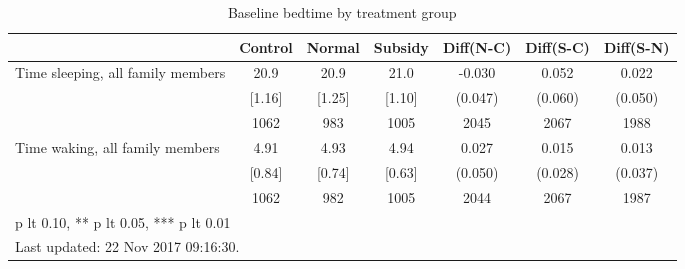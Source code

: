 \begin{table}[htbp]\centering
\def\sym#1{\ifmmode^{#1}\else\(^{#1}\)\fi}
\caption{Baseline bedtime by treatment group \label{tab:"balance"}}
\begin{tabular*}{1\hsize}{@{\hskip\tabcolsep\extracolsep\fill}l*{1}{cccccc}}
\toprule
                                &  Control&   Normal&  Subsidy&Diff(N-C)         &Diff(S-C)         &Diff(S-N)         \\
\midrule
Time sleeping, all family members&     20.9&     20.9&     21.0&   -0.030         &    0.052         &    0.022         \\
                                &   [1.16]&   [1.25]&   [1.10]&  (0.047)         &  (0.060)         &  (0.050)         \\
                                &     1062&      983&     1005&     2045         &     2067         &     1988         \\
Time waking, all family members &     4.91&     4.93&     4.94&    0.027         &    0.015         &    0.013         \\
                                &   [0.84]&   [0.74]&   [0.63]&  (0.050)         &  (0.028)         &  (0.037)         \\
                                &     1062&      982&     1005&     2044         &     2067         &     1987         \\
\bottomrule
\multicolumn{7}{l}{\footnotesize * p lt 0.10, ** p lt 0.05, *** p lt 0.01}\\
\multicolumn{7}{l}{\footnotesize Last updated: 22 Nov 2017 09:16:30.}\\
\end{tabular*}
\end{table}
